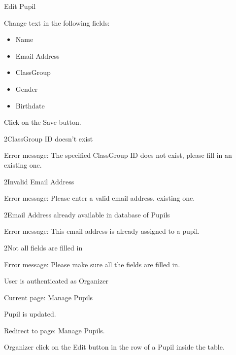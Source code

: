 
\begin{uc}{Edit Pupil}

    \begin{uc-mss}
    \item Change text in the following fields:
        \begin{itemize}
			\item Name
			\item Email Address
			\item ClassGroup
			\item Gender
			\item Birthdate
		\end{itemize}
    \item Click on the Save button.
    \end{uc-mss}

    \begin{uc-ext}

        \begin{uc-fail}{2}{ClassGroup ID doesn't exist}
        \item Error message: The specified ClassGroup ID does not exist, please
            fill in an existing one.
        \end{uc-fail}

        \begin{uc-fail}{2}{Invalid Email Address}
        \item Error message: Please enter a valid email address. existing one.
        \end{uc-fail}

        \begin{uc-fail}{2}{Email Address already available in database of
            Pupils}
        \item Error message: This email address is already assigned to a pupil.
        \end{uc-fail}

        \begin{uc-fail}{2}{Not all fields are filled in}
        \item Error message: Please make sure all the fields are filled in.
        \end{uc-fail}

    \end{uc-ext}

    \begin{uc-pre}
    \item User is authenticated as Organizer
    \item Current page: Manage Pupils
    \end{uc-pre}

    \begin{uc-post}
    \item Pupil is updated.
    \item Redirect to page: Manage Pupils.
    \end{uc-post}

    \begin{uc-trig}
        Organizer click on the Edit button in the row of a Pupil inside the
        table.
    \end{uc-trig}

\end{uc}
